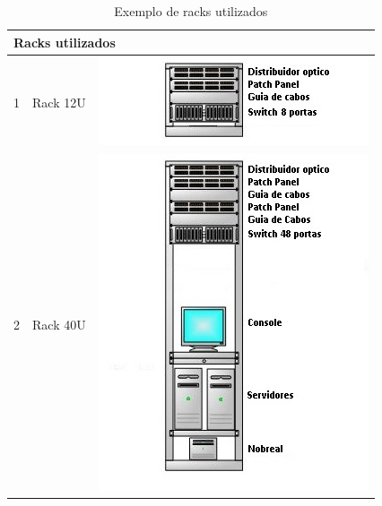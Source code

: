 \begin{table}[h!]
\centering
\caption{Exemplo de racks utilizados}
\label{tab1}
\begin{tabular}{|l|l|l|}
\hline
\multicolumn{3}{|l|}{Racks utilizados} \\ \hline
1        & Rack 12U          & \includegraphics[scale=0.8]{figura5}        \\ \hline
2        & Rack 40U        & \includegraphics[scale=0.8]{figura6}        \\ \hline
\end{tabular}
\end{table}